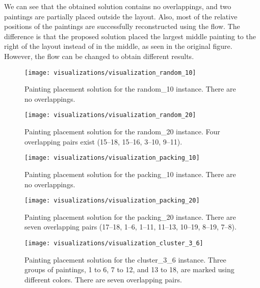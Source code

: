 We can see that the obtained solution contains no overlappings, and two paintings are partially placed outside the layout.
Also, most of the relative positions of the paintings are successfully reconstructed using the flow.
The difference is that the proposed solution placed the largest middle painting to the right of the layout
instead of in the middle, as seen in the original figure.
However, the flow can be changed to obtain different results.


\clearpage
\newpage

\begin{figure}[h!]
    \texttt{[image: visualizations/visualization\_random\_10]}
    \caption[Painting placement solution for the random\_10 instance]
        {Painting placement solution for the random\_10 instance.
    There are no overlappings.}
    \label{fig:results:visualization-random-10}
\end{figure}

\begin{figure}[h!]
    \texttt{[image: visualizations/visualization\_random\_20]}
    \caption[Painting placement solution for the random\_20 instance]
        {Painting placement solution for the random\_20 instance.
    Four overlapping pairs exist (15–18, 15–16, 3–10, 9–11).}
    \label{fig:results:visualization-random-20}
\end{figure}

\begin{figure}[h!]
    \texttt{[image: visualizations/visualization\_packing\_10]}
    \caption[Painting placement solution for the packing\_10 instance]
        {Painting placement solution for the packing\_10 instance.
    There are no overlappings.}
    \label{fig:results:visualization-packing-10}
\end{figure}

\begin{figure}[h!]
    \texttt{[image: visualizations/visualization\_packing\_20]}
    \caption[Painting placement solution for the packing\_20 instance]
        {Painting placement solution for the packing\_20 instance.
    There are seven overlapping pairs (17–18, 1–6, 1–11, 11–13, 10–19, 8–19, 7–8).}
    \label{fig:results:visualization-packing-20}
\end{figure}

\begin{figure}[h!]
    \texttt{[image: visualizations/visualization\_cluster\_3\_6]}
    \caption[Painting placement solution for the cluster\_3\_6 instance]
        { Painting placement solution for the cluster\_3\_6 instance.
    Three groups of paintings, 1 to 6, 7 to 12, and 13 to 18, are marked using different colors.
    There are seven overlapping pairs.}
    \label{fig:results:visualization-cluster-3-6}
\end{figure}

